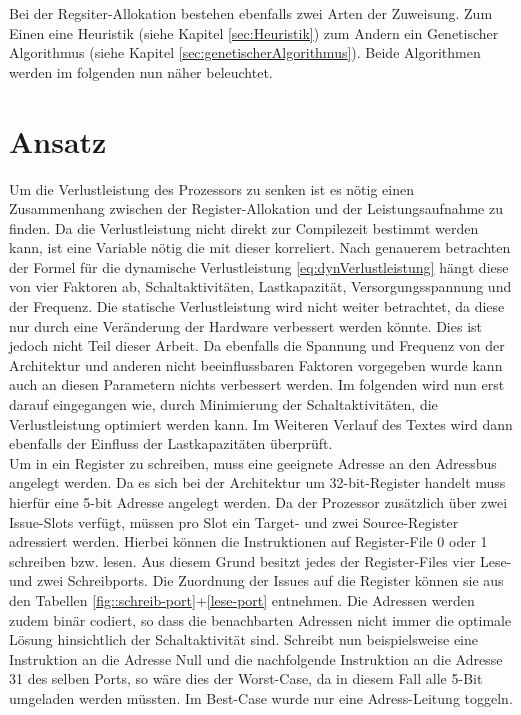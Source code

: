 \begin{itemize}
		Bei der Regsiter-Allokation bestehen ebenfalls zwei Arten der Zuweisung. Zum Einen eine Heuristik (siehe Kapitel \ref{sec:Heuristik}) zum Andern ein Genetischer Algorithmus (siehe Kapitel \ref{sec:genetischerAlgorithmus}). Beide Algorithmen werden im folgenden nun näher beleuchtet.
\end{itemize}


\section{Ansatz}
\label{chap:ansatz}
Um die Verlustleistung des Prozessors zu senken ist es nötig einen Zusammenhang zwischen der Register-Allokation und der Leistungsaufnahme zu finden. Da die Verlustleistung nicht direkt zur Compilezeit bestimmt werden kann, ist eine Variable nötig die mit dieser korreliert.
Nach genauerem betrachten der Formel für die dynamische Verlustleistung \ref{eq:dynVerlustleistung} hängt diese von vier Faktoren ab, Schaltaktivitäten,  Lastkapazität, Versorgungsspannung und der Frequenz. Die statische Verlustleistung wird nicht weiter betrachtet, da diese nur durch eine Veränderung der Hardware verbessert werden könnte. Dies ist jedoch nicht Teil dieser Arbeit. Da ebenfalls die Spannung und Frequenz von der Architektur und anderen nicht beeinflussbaren Faktoren vorgegeben wurde kann auch an diesen Parametern nichts verbessert werden. Im folgenden wird nun erst darauf eingegangen wie, durch Minimierung der Schaltaktivitäten, die Verlustleistung optimiert werden kann. Im Weiteren Verlauf des Textes wird dann ebenfalls der Einfluss der Lastkapazitäten überprüft.\\
Um in ein Register zu schreiben, muss eine geeignete Adresse an den Adressbus angelegt werden. Da es sich bei der Architektur um 32-bit-Register handelt muss hierfür eine 5-bit Adresse angelegt werden.
Da der Prozessor zusätzlich über zwei Issue-Slots verfügt, müssen pro Slot ein Target- und zwei Source-Register adressiert werden. Hierbei können die Instruktionen auf Register-File 0 oder 1 schreiben bzw. lesen. Aus diesem Grund besitzt jedes der Register-Files vier Lese- und zwei Schreibports. Die Zuordnung der Issues auf die Register können sie aus den Tabellen \ref{fig::schreib-port}+\ref{lese-port} entnehmen. Die Adressen werden zudem binär codiert, so dass die benachbarten Adressen nicht immer die optimale Lösung hinsichtlich der Schaltaktivität sind. Schreibt nun beispielsweise eine Instruktion an die Adresse Null und die nachfolgende Instruktion an die Adresse 31 des selben Ports, so wäre dies der Worst-Case, da in diesem Fall alle 5-Bit umgeladen werden müssten. Im Best-Case wurde nur eine Adress-Leitung toggeln.\\
